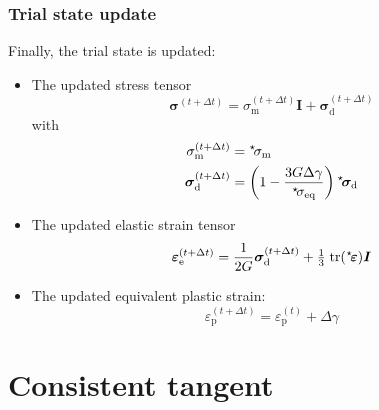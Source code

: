 \documentclass[times,namecite]{goose-article}
\newcommand\leftstar[1]{\hspace*{-.3em}~^\star\!#1}
\begin{document}
\subsubsection{Trial state update}

Finally, the trial state is updated:
\begin{itemize}
%
\item The updated stress tensor
\begin{equation}
  \bm{\sigma}^{(t+\Delta t)}
    = \sigma_\mathrm{m}^{(t+\Delta t)} \bm{I}
    + \bm{\sigma}_\mathrm{d}^{(t+\Delta t)}
\end{equation}
with
\begin{align}
  \sigma_\mathrm{m}^{(t+\Delta t)}
    &= \leftstar{\sigma}_\mathrm{m}
  \\
  \bm{\sigma}_\mathrm{d}^{(t+\Delta t)}
    &= \left(
         1 - \frac{3 G \Delta \gamma}{\leftstar{\sigma}_\mathrm{eq}}
       \right) \leftstar{\bm{\sigma}}_\mathrm{d}
\end{align}
%
\item The updated elastic strain tensor
\begin{equation}
  \bm{\varepsilon}_\mathrm{e}^{(t+\Delta t)}
    = \frac{1}{2G} \bm{\sigma}^{(t+\Delta t)}_\mathrm{d}
    + \tfrac{1}{3} \;\mathrm{tr} (\leftstar{\bm{\varepsilon}}) \bm{I}
\end{equation}
%
\item The updated equivalent plastic strain:
\begin{equation}
  \varepsilon_\mathrm{p}^{(t+\Delta t)}
    = \varepsilon_\mathrm{p}^{(t)}
    + \Delta \gamma
\end{equation}
%
\end{itemize}

\section{Consistent tangent}
\end{document}
